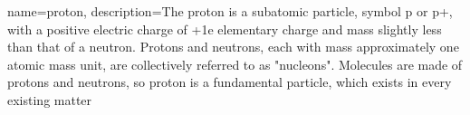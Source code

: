 
{
    name=proton,
    description={The proton is a subatomic particle, symbol p or p+, with a positive electric charge of +1e elementary charge and mass slightly less than that of a neutron. Protons and neutrons, each with mass approximately one atomic mass unit, are collectively referred to as "nucleons". Molecules are made of protons and neutrons, so proton is a fundamental particle, which exists in every existing matter}
}
